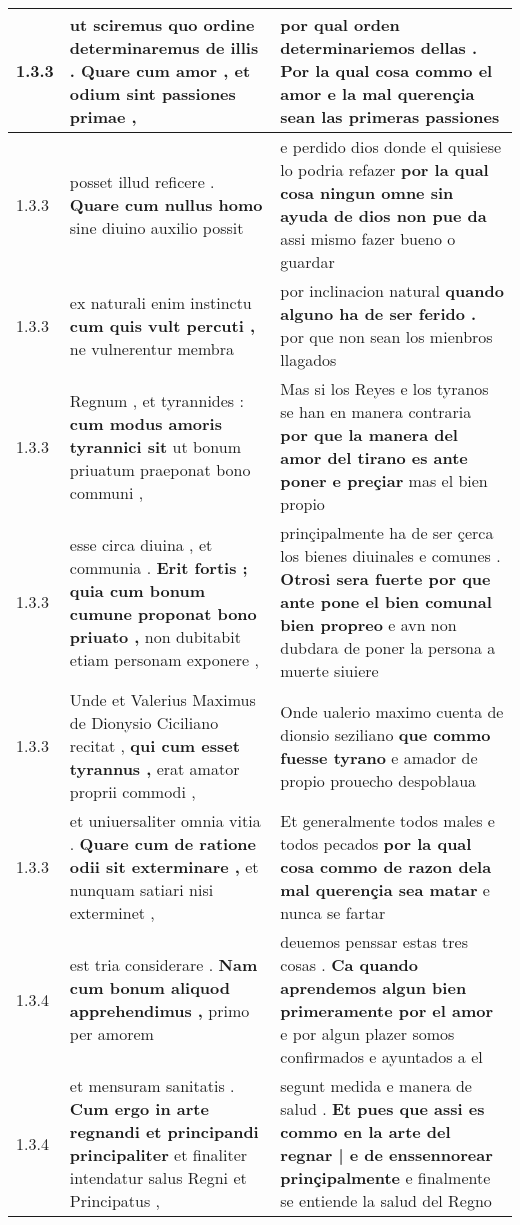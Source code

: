 \begin{tabular}{|p{1cm}|p{6.5cm}|p{6.5cm}|}
1.3.3 & ut sciremus quo ordine determinaremus de illis . \textbf{ Quare cum amor , } et odium sint passiones primae , & por qual orden determinariemos dellas . \textbf{ Por la qual cosa commo el amor e la mal querençia } sean las primeras passiones \\\hline
1.3.3 & posset illud reficere . \textbf{ Quare cum nullus homo } sine diuino auxilio possit & e perdido dios donde el quisiese lo podria refazer \textbf{ por la qual cosa ningun omne sin ayuda de dios non pue da } assi mismo fazer bueno o guardar \\\hline
1.3.3 & ex naturali enim instinctu \textbf{ cum quis vult percuti , } ne vulnerentur membra & por inclinacion natural \textbf{ quando alguno ha de ser ferido . } por que non sean los mienbros llagados \\\hline
1.3.3 & Regnum , et tyrannides : \textbf{ cum modus amoris tyrannici sit } ut bonum priuatum praeponat bono communi , & Mas si los Reyes e los tyranos se han en manera contraria \textbf{ por que la manera del amor del tirano es ante poner e preçiar } mas el bien propio \\\hline
1.3.3 & esse circa diuina , et communia . \textbf{ Erit fortis ; quia cum bonum cumune proponat bono priuato , } non dubitabit etiam personam exponere , & prinçipalmente ha de ser çerca los bienes diuinales e comunes . \textbf{ Otrosi sera fuerte por que ante pone el bien comunal bien propreo } e avn non dubdara de poner la persona a muerte siuiere \\\hline
1.3.3 & Unde et Valerius Maximus de Dionysio Ciciliano recitat , \textbf{ qui cum esset tyrannus , } erat amator proprii commodi , & Onde ualerio maximo cuenta de dionsio seziliano \textbf{ que commo fuesse tyrano } e amador de propio prouecho despoblaua \\\hline
1.3.3 & et uniuersaliter omnia vitia . \textbf{ Quare cum de ratione odii sit exterminare , } et nunquam satiari nisi exterminet , & Et generalmente todos males e todos pecados \textbf{ por la qual cosa commo de razon dela mal querençia sea matar } e nunca se fartar \\\hline
1.3.4 & est tria considerare . \textbf{ Nam cum bonum aliquod apprehendimus , } primo per amorem & deuemos penssar estas tres cosas . \textbf{ Ca quando aprendemos algun bien primeramente por el amor } e por algun plazer somos confirmados e ayuntados a el \\\hline
1.3.4 & et mensuram sanitatis . \textbf{ Cum ergo in arte regnandi et principandi principaliter } et finaliter intendatur salus Regni et Principatus , & segunt medida e manera de salud . \textbf{ Et pues que assi es commo en la arte del regnar | e de enssennorear prinçipalmente } e finalmente se entiende la salud del Regno \\\hline

\end{tabular}
